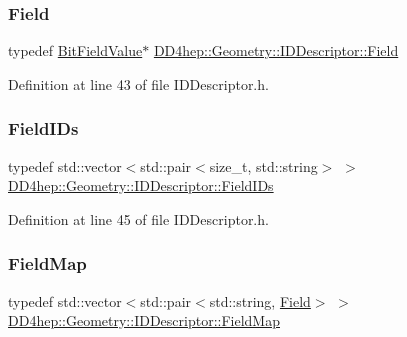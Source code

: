 \subsubsection{\texorpdfstring{Field}{Field}}
{\footnotesize\ttfamily typedef \hyperlink{class_d_d4hep_1_1_d_d_segmentation_1_1_bit_field_value}{Bit\+Field\+Value}$\ast$ \hyperlink{class_d_d4hep_1_1_geometry_1_1_i_d_descriptor_ac06f5915e74f8a8f2ff73e9a322556e4}{D\+D4hep\+::\+Geometry\+::\+I\+D\+Descriptor\+::\+Field}}



Definition at line 43 of file I\+D\+Descriptor.\+h.

\hypertarget{class_d_d4hep_1_1_geometry_1_1_i_d_descriptor_a0ced4a2fe6dd5775becad359f39a9ee2}{}\label{class_d_d4hep_1_1_geometry_1_1_i_d_descriptor_a0ced4a2fe6dd5775becad359f39a9ee2} 
\subsubsection{\texorpdfstring{Field\+I\+Ds}{FieldIDs}}
{\footnotesize\ttfamily typedef std\+::vector$<$std\+::pair$<$size\+\_\+t, std\+::string$>$ $>$ \hyperlink{class_d_d4hep_1_1_geometry_1_1_i_d_descriptor_a0ced4a2fe6dd5775becad359f39a9ee2}{D\+D4hep\+::\+Geometry\+::\+I\+D\+Descriptor\+::\+Field\+I\+Ds}}



Definition at line 45 of file I\+D\+Descriptor.\+h.

\hypertarget{class_d_d4hep_1_1_geometry_1_1_i_d_descriptor_ac9d6740c50e0c5cf495486c55e5640d4}{}\label{class_d_d4hep_1_1_geometry_1_1_i_d_descriptor_ac9d6740c50e0c5cf495486c55e5640d4} 
\subsubsection{\texorpdfstring{Field\+Map}{FieldMap}}
{\footnotesize\ttfamily typedef std\+::vector$<$std\+::pair$<$std\+::string, \hyperlink{class_d_d4hep_1_1_geometry_1_1_i_d_descriptor_ac06f5915e74f8a8f2ff73e9a322556e4}{Field}$>$ $>$ \hyperlink{class_d_d4hep_1_1_geometry_1_1_i_d_descriptor_ac9d6740c50e0c5cf495486c55e5640d4}{D\+D4hep\+::\+Geometry\+::\+I\+D\+Descriptor\+::\+Field\+Map}}



